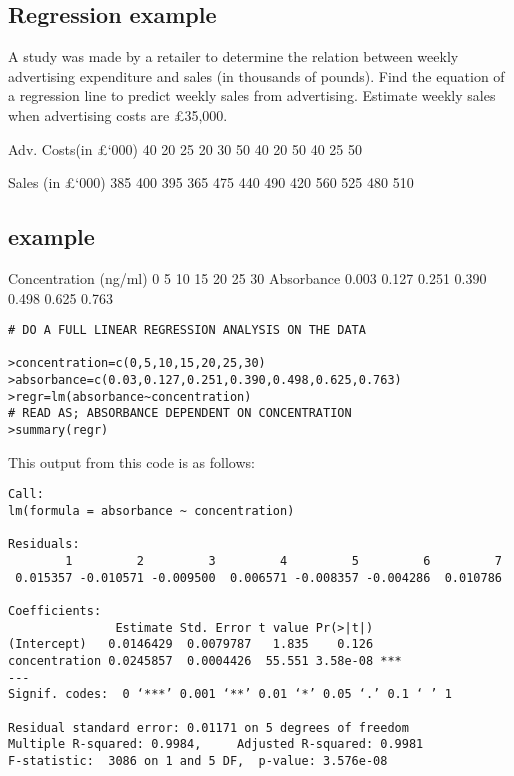 \subsection{Regression example}
A study was made by a retailer to determine the relation between weekly advertising
expenditure and sales (in thousands of pounds). Find the equation of a regression line
to predict weekly sales from advertising. Estimate weekly sales when advertising
costs are £35,000.

Adv. Costs(in £‘000) 40 20 25 20 30 50 40 20 50 40 25 50

Sales (in £‘000) 385 400 395 365 475 440 490 420 560 525 480 510



\subsection{example}
Concentration (ng/ml) 0 5 10 15 20 25 30
Absorbance 0.003 0.127 0.251 0.390 0.498 0.625 0.763

\begin{verbatim}
# DO A FULL LINEAR REGRESSION ANALYSIS ON THE DATA

>concentration=c(0,5,10,15,20,25,30)
>absorbance=c(0.03,0.127,0.251,0.390,0.498,0.625,0.763)
>regr=lm(absorbance~concentration)
# READ AS; ABSORBANCE DEPENDENT ON CONCENTRATION
>summary(regr)
\end{verbatim}

This output from this code is as follows:
\begin{verbatim}
Call:
lm(formula = absorbance ~ concentration)

Residuals:
        1         2         3         4         5         6         7
 0.015357 -0.010571 -0.009500  0.006571 -0.008357 -0.004286  0.010786

Coefficients:
               Estimate Std. Error t value Pr(>|t|)
(Intercept)   0.0146429  0.0079787   1.835    0.126
concentration 0.0245857  0.0004426  55.551 3.58e-08 ***
---
Signif. codes:  0 ‘***’ 0.001 ‘**’ 0.01 ‘*’ 0.05 ‘.’ 0.1 ‘ ’ 1

Residual standard error: 0.01171 on 5 degrees of freedom
Multiple R-squared: 0.9984,     Adjusted R-squared: 0.9981
F-statistic:  3086 on 1 and 5 DF,  p-value: 3.576e-08

\end{verbatim}


